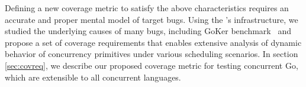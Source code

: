 Defining a new coverage metric to satisfy the above characteristics requires an accurate and proper mental model of target bugs.
%
Using the \goat's infrastructure, we studied the underlying causes of many bugs, including GoKer benchmark~\cite{yuan-gobench-cgo21} and propose a set of coverage requirements that enables extensive analysis of dynamic behavior of concurrency primitives under various scheduling scenarios.
%
In section \ref{sec:covreq}, we describe our proposed coverage metric for testing concurrent Go, which are extensible to all concurrent languages.
